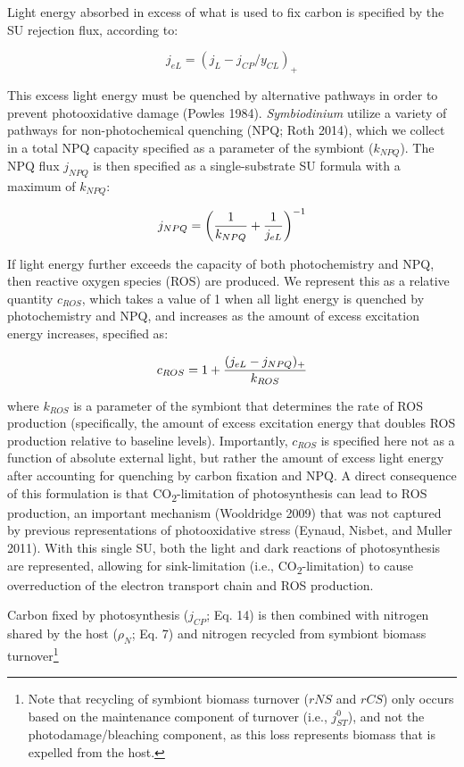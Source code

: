 \documentclass[]{elsarticle} %
\begin{document}
Light energy absorbed in excess of what is used to fix carbon is
specified by the SU rejection flux, according to:

\begin{equation} j_{eL} = (j_L - j_{CP} / y_{CL})_+ \end{equation}

This excess light energy must be quenched by alternative pathways in
order to prevent photooxidative damage (Powles 1984).
\emph{Symbiodinium} utilize a variety of pathways for non-photochemical
quenching (NPQ; Roth 2014), which we collect in a total NPQ capacity
specified as a parameter of the symbiont (\(k_{NPQ}\)). The NPQ flux
\(j_{NPQ}\) is then specified as a single-substrate SU formula with a
maximum of \(k_{NPQ}\):

\begin{equation} j_{NPQ} = \bigg({1 \over k_{NPQ}} + {1 \over j_{eL}}\bigg)^{-1} \end{equation}

If light energy further exceeds the capacity of both photochemistry and
NPQ, then reactive oxygen species (ROS) are produced. We represent this
as a relative quantity \(c_{ROS}\), which takes a value of 1 when all
light energy is quenched by photochemistry and NPQ, and increases as the
amount of excess excitation energy increases, specified as:

\begin{equation} c_{ROS} = 1 + {{(j_{eL} - j_{NPQ})_+} \over k_{ROS}} \end{equation}

where \(k_{ROS}\) is a parameter of the symbiont that determines the
rate of ROS production (specifically, the amount of excess excitation
energy that doubles ROS production relative to baseline levels).
Importantly, \(c_{ROS}\) is specified here not as a function of absolute
external light, but rather the amount of excess light energy after
accounting for quenching by carbon fixation and NPQ. A direct
consequence of this formulation is that CO\textsubscript{2}-limitation
of photosynthesis can lead to ROS production, an important mechanism
(Wooldridge 2009) that was not captured by previous representations of
photooxidative stress (Eynaud, Nisbet, and Muller 2011). With this
single SU, both the light and dark reactions of photosynthesis are
represented, allowing for sink-limitation (i.e.,
CO\textsubscript{2}-limitation) to cause overreduction of the electron
transport chain and ROS production.

Carbon fixed by photosynthesis (\(j_{CP}\); Eq. 14) is then combined
with nitrogen shared by the host (\(\rho_N\); Eq. 7) and nitrogen
recycled from symbiont biomass turnover\footnote{Note that recycling of
  symbiont biomass turnover (\(rNS\) and \(rCS\)) only occurs based on
  the maintenance component of turnover (i.e., \(j_{ST}^0\)), and not
  the photodamage/bleaching component, as this loss represents biomass
  that is expelled from the host.}
\end{document}
